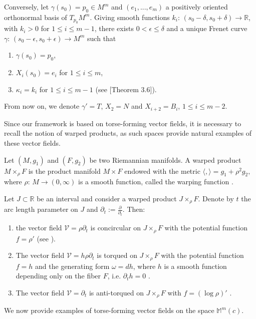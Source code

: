 \documentclass[12pt]{amsart}
\def\r{\mathbb R}
\def\m{\mathbb M}
\def\v{\mathcal V}
\theoremstyle{definition}
\begin{document}
Conversely, let $\gamma(s_0)=p_0\in M^m$ and $(e_1,...,e_m)$ a positively oriented orthonormal basis of $T_{p_0}M^m$. Giving smooth functions $k_i:\,(s_0-\delta,s_0+\delta)\to \r$, with $k_i >0$ for $1\leq i \leq m-1$, there exists $0< \epsilon \leq \delta$ and a unique Frenet curve $\gamma:\,(s_0-\epsilon,s_0+\epsilon)\to M^m$ such that
\begin{enumerate}
\item[(i)] $\gamma(s_0)=p_0$,
\item[(ii)] $X_i(s_0)=e_i$ for $1\leq i \leq m$,
\item[(iii)] $\kappa_i=k_i$ for $1\leq i \leq m-1$ (see [Theorem 3.6]\cite{lmm}).
\end{enumerate}

From now on, we denote $\gamma'=T$, $X_2=N$ and $X_{i+2}=B_i$, $1\leq i \leq m-2$. 

Since our framework is based on torse-forming vector fields, it is necessary to recall the notion of warped products, as such spaces provide natural examples of these vector fields.

Let $(M,g_1)$ and $(F,g_2)$ be two Riemannian manifolds.  A warped product $M \times_{\rho} F$ is the product manifold $M \times F$ endowed with the metric $\langle , \rangle=g_1+\rho^2g_2,$ 
where $\rho:\,M\to (0,\infty)$ is a smooth function, called the warping function \cite{cbook}.

Let $J\subset \r$ be an interval and consider a warped product $J\times_\rho F$. Denote by $t$ the arc length parameter on $J$ and $\partial_t:=\frac{\partial}{\partial_t}$. Then:
\begin{enumerate}
\item[(i)] the vector field $\v=\rho\partial_t$ is concircular on $J\times_\rho F$ with the potential function $f=\rho'$ (see \cite[Example 1.1]{cbook}).
\item[(ii)] The vector field $\v=h\rho\partial_t$ is torqued on $J\times_\rho F$ with the potential function $f=h$ and the generating form $\omega=dh$, where $h$ is a smooth function depending only on the fiber $F$, i.e. $\partial_t h=0$ \cite[Theorem 2.3] {c01}.
\item[(iii)] The vector field $\v=\partial_t$ is anti-torqued on $J\times_\rho F$ with $f=(\log \rho)'$  \cite[Theorem 3.1]{amc1}.
\end{enumerate}

We now provide examples of torse-forming vector fields on the space $\m^m(c)$.
\end{document}
